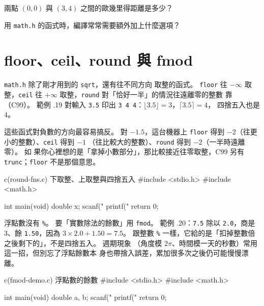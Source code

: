 
\begin{drills}[label=drills:float-math-lib]
\item 兩點 $(0,0)$ 與 $(3,4)$ 之間的歐幾里得距離是多少？
\item 用 \texttt{math.h} 的函式時，編譯常常需要額外加上什麼選項？
\end{drills}

\section{floor、ceil、round 與 fmod}
\label{sec:float-round-fns}

\texttt{math.h} 除了剛才用到的 \texttt{sqrt}，還有往不同方向
取整的函式。 \texttt{floor} 往 $-\infty$ 取整，\texttt{ceil} 往
$+\infty$ 取整，\texttt{round} 對「恰好一半」的情況往遠離零的整數
靠（C99）。 範例 \thechapter.19 對輸入 \texttt{3.5} 印出
\texttt{3 4 4}：$\lfloor 3.5\rfloor = 3$，$\lceil 3.5\rceil = 4$，
四捨五入也是 $4$。

這些函式對負數的方向最容易搞反。 對 $-1.5$，這台機器上
\texttt{floor} 得到 $-2$（往更小的整數）、\texttt{ceil} 得到 $-1$
（往比較大的整數）、\texttt{round} 得到 $-2$（一半時遠離零）。 如
果你心裡想的是「拿掉小數部分」，那比較接近往零取整，C99 另有
\texttt{trunc}；\texttt{floor} 不是那個意思。

\begin{example}{c}{(round-fns.c) 下取整、上取整與四捨五入}
#include <stdio.h>
#include <math.h>

int main(void) {
    double x;
    scanf("%
    printf("%
    return 0;
}
\end{example}


浮點數沒有 \texttt{\%}。 要「實數除法的餘數」用 \texttt{fmod}。 範例
\thechapter.20：\texttt{7.5} 除以 \texttt{2.0}，商是 $3$、餘
\texttt{1.50}，因為 $3 \times 2.0 + 1.50 = 7.5$。 跟整數 \texttt{\%}
一樣，它給的是「扣掉整數倍之後剩下的」，不是四捨五入。 週期現象
（角度模 $2\pi$、時間模一天的秒數）常用這一招，但別忘了浮點餘數本
身也帶捨入誤差，累加很多次之後仍可能慢慢漂離。

\begin{example}{c}{(fmod-demo.c) 浮點數的餘數}
#include <stdio.h>
#include <math.h>

int main(void) {
    double a, b;
    scanf("%
    printf("%
    return 0;
}
\end{example}

